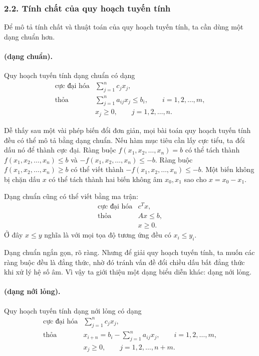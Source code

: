 \documentclass[11pt]{article}
\begin{document}
\subsubsection*{2.2. Tính chất của quy hoạch tuyến tính}

Để mô tả tính chất và thuật toán của quy hoạch tuyến tính, ta cần dùng một
dạng chuẩn hơn.

\paragraph{ (dạng chuẩn).}
Quy hoạch tuyến tính dạng chuẩn có dạng
\[
\begin{array}{ll}
\text{cực đại hóa} & \displaystyle \sum_{j=1}^{n} c_jx_j,\\[0.4em]
\text{thỏa} & \displaystyle \sum_{j=1}^{n} a_{ij}x_j\le b_i,
  \qquad i=1,2,\ldots,m,\\[0.4em]
& x_j\ge 0,\qquad j=1,2,\ldots,n.
\end{array}
\]

Dễ thấy sau một vài phép biến đổi đơn giản, mọi bài toán quy hoạch tuyến tính
đều có thể mô tả bằng dạng chuẩn. Nếu hàm mục tiêu cần lấy cực tiểu, ta đổi
dấu nó để thành cực đại. Ràng buộc \(f(x_1,x_2,\ldots,x_n)=b\) có thể tách
thành \(f(x_1,x_2,\ldots,x_n)\le b\) và \(-f(x_1,x_2,\ldots,x_n)\le -b\).
Ràng buộc \(f(x_1,x_2,\ldots,x_n)\ge b\) có thể viết thành
\(-f(x_1,x_2,\ldots,x_n)\le -b\). Một biến không bị chặn dấu \(x\) có thể tách
thành hai biến không âm \(x_0,x_1\) sao cho \(x=x_0-x_1\).

Dạng chuẩn cũng có thể viết bằng ma trận:
\[
\begin{array}{ll}
\text{cực đại hóa} & c^T x,\\
\text{thỏa} & Ax\le b,\\
& x\ge 0.
\end{array}\tag{2.2.1}
\]
Ở đây \(x\le y\) nghĩa là với mọi tọa độ tương ứng đều có \(x_i\le y_i\).

Dạng chuẩn ngắn gọn, rõ ràng. Nhưng để giải quy hoạch tuyến tính, ta muốn các
ràng buộc đều là đẳng thức, nhờ đó tránh vấn đề đổi chiều dấu bất đẳng thức
khi xử lý hệ số âm. Vì vậy ta giới thiệu một dạng biểu diễn khác: dạng nới
lỏng.

\paragraph{ (dạng nới lỏng).}
Quy hoạch tuyến tính dạng nới lỏng có dạng
\[
\begin{array}{ll}
\text{cực đại hóa} & \displaystyle \sum_{j=1}^{n} c_jx_j,\\[0.4em]
\text{thỏa} &
  \displaystyle x_{i+n}=b_i-\sum_{j=1}^{n}a_{ij}x_j,
  \qquad i=1,2,\ldots,m,\\[0.4em]
& x_j\ge 0,\qquad j=1,2,\ldots,n+m.
\end{array}
\]
\end{document}
